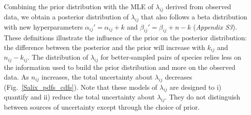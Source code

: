 \documentclass[12pt]{article}
\begin{document}
\begin{spacing}{1.5}
    Combining the prior distribution with the MLE of $\lambda_{ij}$ derived from observed data, we obtain a posterior distribution of $\lambda_{ij}$ that also follows a beta distribution with new hyperparameters $\alpha_{ij}'=\alpha_{ij}+k$ and $\beta_{ij}'=\beta_{ij}+n-k$ (\emph{Appendix S3}). These definitions illustrate the influence of the prior on the posterior distribution: the difference between the posterior and the prior will increase with $k_{ij}$ and $n_{ij}-k_{ij}$. The distribution of $\lambda_{ij}$ for better-sampled pairs of species relies less on the information used to build the prior distribution and more on the observed data. As $n_{ij}$ increases, the total uncertainty about $\lambda_{ij}$ decreases (Fig.~\ref{Salix_pdfs_cdfs}). Note that these models of $\lambda_{ij}$ are designed to i) quantify and ii) reduce the total uncertainty about $\lambda_{ij}$. They do not distinguish between sources of uncertainty except through the choice of prior.









\end{spacing}
\end{document}
